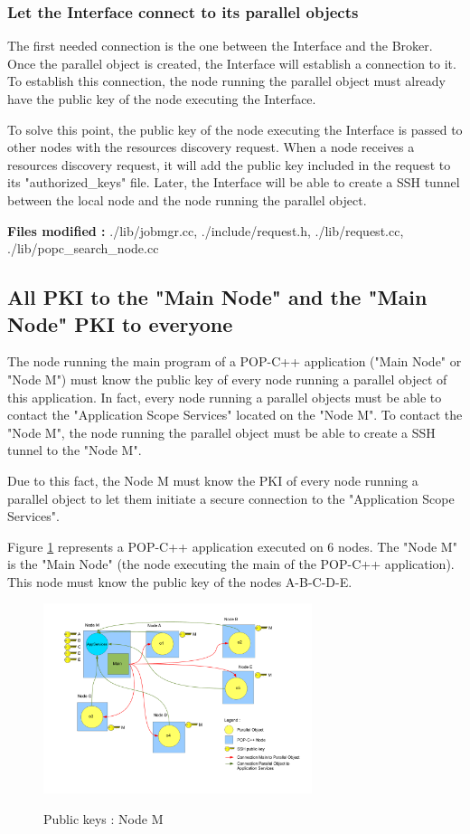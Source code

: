 \subsubsection{Let the Interface connect to its parallel objects}
The first needed connection is the one between the Interface and the Broker. Once the parallel object is created, the Interface will establish a connection to it. To establish this connection, the node running the parallel object must already have the public key of the node executing the Interface.\s

To solve this point, the public key of the node executing the Interface is passed to other nodes with the resources discovery request. When a node receives a resources discovery request, it will add the public key included in the request to its "authorized\_keys" file. Later, the Interface will be able to create a SSH tunnel between the local node and the node running the parallel object.\s

\textbf{Files modified : } ./lib/jobmgr.cc, ./include/request.h, ./lib/request.cc, ./lib/popc\_search\_node.cc

\subsection{All PKI to the "Main Node" and the "Main Node" PKI to everyone}
The node running the main program of a POP-C++ application ("Main Node" or "Node M") must know the public key of every node running a parallel object of this application. In fact, every node running a parallel objects must be able to contact the "Application Scope Services" located on the "Node M". To contact the "Node M", the node running the parallel object must be able to create a SSH tunnel to the "Node M". \s

Due to this fact, the Node M must know the PKI of every node running a parallel object to let them initiate a secure connection to the "Application Scope Services".\s

Figure \ref{fig:keys_main} represents a POP-C++ application executed on 6 nodes. The "Node M" is the "Main Node" (the node executing the main of the POP-C++ application). This node must know the public key of the nodes A-B-C-D-E. 
\begin{figure}[ht]
	\caption{Public keys : Node M}
  	\centering
	\includegraphics[width=0.70\textwidth]{../main_keys.pdf}
	\label{fig:keys_main}
\end{figure}

